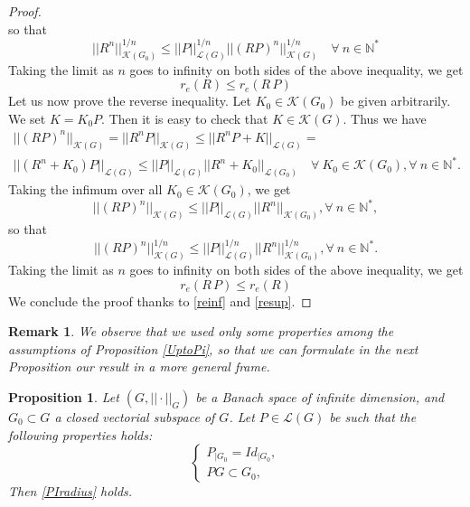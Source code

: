 \documentclass[10pt, english]{article}
\newtheorem{prop}[thm]{Proposition}
\newtheorem{oss}[thm]{Remark}
\begin{document}
{\begin{proof}
$$$$
so that
$$
||R^n||^{1/n}_{\mathcal{K}(G_0)} \leqslant ||P||^{1/n}_{\mathcal{L}(G)} ||(RP)^n||^{1/n}_{\mathcal{K}(G)} \quad \forall \ n \in \mathbb{N}^{\ast}
$$
Taking the limit as $n$ goes to infinity on both sides of the above inequality, we get
\begin{equation}\label{reinf}
r_e(R) \leqslant r_e(R\,P)
\end{equation}
Let us now  prove the reverse inequality. Let $K_0 \in \mathcal{K}(G_0)$ be given arbitrarily. We set $K=K_0P$. Then it is easy to check that $K \in \mathcal{K}(G)$. Thus we have
\begin{multline*}\label{RnK0}
||(RP)^n||_{\mathcal{K}(G)} = ||R^nP||_{\mathcal{K}(G)}\leqslant ||R^n P+ K||_{\mathcal{L}(G)} = \\
||(R^n + K_0)P||_{\mathcal{L}(G)} \leqslant 
||P||_{\mathcal{L}(G)} ||R^n + K_0||_{\mathcal{L}(G_0)} \quad \forall \ K_0 \in \mathcal{K}(G_0), \forall \ n  \in \mathbb{N}^{\ast}.
\end{multline*}
Taking the infimum over all $K_0 \in \mathcal{K}(G_0)$, we get
\begin{equation*}\label{RnK0}
||(RP)^n||_{\mathcal{K}(G)} \leqslant 
||P||_{\mathcal{L}(G)} ||R^n||_{\mathcal{K}(G_0)}, \forall \  n \in \mathbb{N}^{\ast},
\end{equation*}
so that 
\begin{equation*}
||(RP)^n||^{1/n}_{\mathcal{K}(G)} \leqslant 
||P||^{1/n}_{\mathcal{L}(G)} ||R^n||^{1/n}_{\mathcal{K}(G_0)},\forall \  n \in \mathbb{N}^{\ast}.
\end{equation*}
Taking the limit as $n$ goes to infinity on both sides of the above inequality, we get
\begin{equation}\label{resup}
r_e(R\,P) \leqslant r_e(R)
\end{equation}
We conclude the proof thanks to \eqref{reinf} and \eqref{resup}.
\end{proof}
\begin{oss}\label{Utopi}
We observe that we used only some properties among the assumptions of Proposition \ref{UptoPi}, so that we can formulate in the next Proposition our result in a more general frame.
\end{oss}
\begin{prop}\label{UptoPiB}
Let $(G, ||\cdot||_G)$  be a Banach space of infinite dimension, and $G_0 \subset G$ a closed vectorial subspace of $G$. Let $P \in \mathcal{L}(G)$ be such that the following properties holds:
\begin{equation}\label{PBanach}
\begin{cases}
P_{|G_0}=Id_{|G_0},\\
PG \subset G_0,
\end{cases}
\end{equation}
Then \eqref{PIradius} holds.
\end{prop}

}
\end{document}

